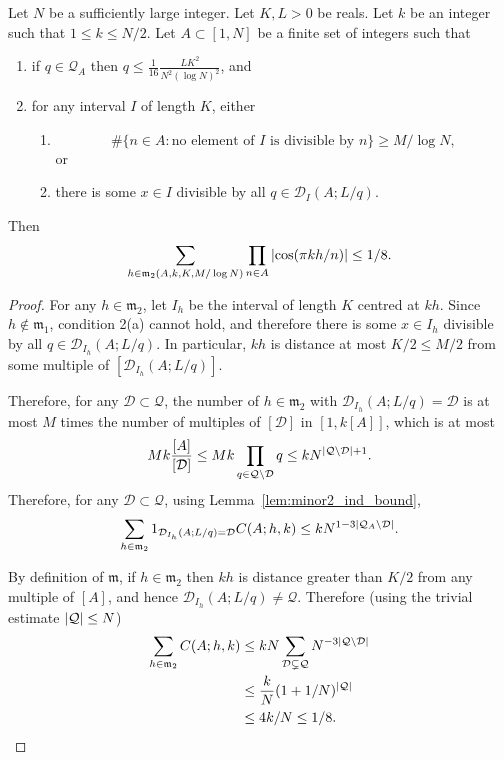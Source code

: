 \begin{lemma}\label{lem:minor2_bound}
Let $N$ be a sufficiently large integer. Let $K,L>0$ be reals. Let $k$ be an integer such that $1\leq k \leq N/2$.  Let $A\subset [1,N]$ be a finite set of integers such that
\begin{enumerate}
\item if $q\in\mathcal{Q}_A$ then $q\leq \tfrac{1}{16}\frac{LK^2}{N^2(\log N)^2}$,  and
\item for any interval $I$ of length $K$, either
\begin{enumerate}
\item \[\# \{ n\in A : \textrm{no element of }I\textrm{ is divisible by }n\}\geq M/\log N,\]
or
\item there is some $x\in I$ divisible by all $q\in\mathcal{D}_I(A;L/q)$.
\end{enumerate}
\end{enumerate}
Then
\[\sum_{h\in\mathfrak{m}_2(A,k,K,M/\log N)}\prod_{n\in A}\left\lvert \cos(\pi kh/n)\right\rvert\leq 1/8.\]
\end{lemma}
\begin{proof}
For any $h\in\mathfrak{m}_2$, let $I_h$ be the interval of length $K$ centred at $kh$. Since $h\not\in\mathfrak{m}_1$, condition 2(a) cannot hold, and therefore there is some $x\in I_h$ divisible by all $q\in\mathcal{D}_{I_h}(A;L/q)$. In particular, $kh$ is distance at most $K/2\leq M/2$ from some multiple of $[\mathcal{D}_{I_h}(A;L/q)]$.

Therefore, for any $\mathcal{D}\subset \mathcal{Q}$, the number of $h\in\mathfrak{m}_2$ with $\mathcal{D}_{I_h}(A;L/q)=\mathcal{D}$ is at most $M$ times the number of multiples of $[\mathcal{D}]$ in $[1,k[A]]$, which is at most
\[Mk\frac{[A]}{[\mathcal{D}]} \leq Mk\prod_{q\in\mathcal{Q}\backslash\mathcal{D}}q\leq kN^{\left\lvert \mathcal{Q}\backslash \mathcal{D}\right\rvert+1}.\]
Therefore, for any $\mathcal{D}\subset\mathcal{Q}$, using Lemma~\ref{lem:minor2_ind_bound},
\[\sum_{h\in \mathfrak{m}_2}1_{\mathcal{D}_{I_h}(A;L/q)=\mathcal{D}}C(A;h,k)\leq kN^{1-3\left\lvert \mathcal{Q}_A\backslash\mathcal{D}\right\rvert}.\]


By definition of $\mathfrak{m}$, if $h\in\mathfrak{m}_2$ then $kh$ is distance greater than $K/2$ from any multiple of $[A]$, and hence $\mathcal{D}_{I_h}(A;L/q)\neq \mathcal{Q}$. Therefore (using the trivial estimate $\left\lvert \mathcal{Q}\right\rvert\leq N$)
\begin{align*}
\sum_{h\in\mathfrak{m}_2}C(A;h,k)
&\leq
kN\sum_{\mathcal{D}\subsetneq \mathcal{Q}}N^{-3\left\lvert \mathcal{Q}\backslash \mathcal{D}\right\rvert}\\
&\leq \frac{k}{N}(1+1/N)^{\left\lvert \mathcal{Q}\right\rvert}\\
&\leq 4k/N \leq 1/8.
\end{align*}
\end{proof}

